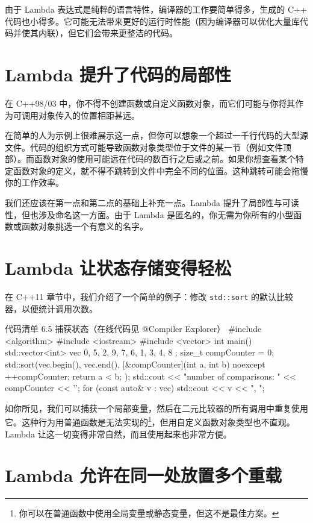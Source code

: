 由于 Lambda 表达式是纯粹的语言特性，编译器的工作要简单得多，生成的 C++ 代码也小得多。它可能无法带来更好的运行时性能（因为编译器可以优化大量库代码并使其内联），但它们会带来更整洁的代码。

\section{Lambda 提升了代码的局部性}

在 C++98/03 中，你不得不创建函数或自定义函数对象，而它们可能与你将其作为可调用对象传入的位置相距甚远。

在简单的人为示例上很难展示这一点，但你可以想象一个超过一千行代码的大型源文件。代码的组织方式可能导致函数对象类型位于文件的某一节（例如文件顶部）。而函数对象的使用可能远在代码的数百行之后或之前。如果你想查看某个特定函数对象的定义，就不得不跳转到文件中完全不同的位置。这种跳转可能会拖慢你的工作效率。


我们还应该在第一点和第二点的基础上补充一点。Lambda 提升了局部性与可读性，但也涉及命名这一方面。由于 Lambda 是匿名的，你无需为你所有的小型函数或函数对象挑选一个有意义的名字。

\section{Lambda 让状态存储变得轻松}

在 C++11 章节中，我们介绍了一个简单的例子：修改 \texttt{std::sort} 的默认比较器，以便统计调用次数。

\begin{codeboxt}{代码清单 6.5 捕获状态（在线代码见 @Compiler Explorer）}
#include <algorithm>
#include <iostream>
#include <vector>
int main() {
std::vector<int> vec { 0, 5, 2, 9, 7, 6, 1, 3, 4, 8 };
size_t compCounter = 0;
std::sort(vec.begin(), vec.end(),
[&compCounter](int a, int b) noexcept {
++compCounter;
return a < b;
});
std::cout << "number of comparisons: " << compCounter << '\n';
for (const auto& v : vec)
std::cout << v << ", ";
}
\end{codeboxt}

如你所见，我们可以捕获一个局部变量，然后在二元比较器的所有调用中重复使用它。这种行为用普通函数是无法实现的\footnote{你可以在普通函数中使用全局变量或静态变量，但这不是最佳方案。}，但用自定义函数对象类型也不直观。Lambda 让这一切变得非常自然，而且使用起来也非常方便。

\section{Lambda 允许在同一处放置多个重载}

